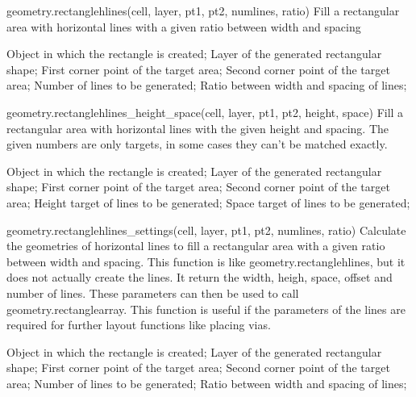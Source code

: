 \begin{APIfunc}{geometry.rectanglehlines(cell, layer, pt1, pt2, numlines, ratio)}
    Fill a rectangular area with horizontal lines with a given ratio between width and spacing
    \begin{APIparameters}
            Object in which the rectangle is created;
            Layer of the generated rectangular shape;
            First corner point of the target area;
            Second corner point of the target area;
            Number of lines to be generated;
            Ratio between width and spacing of lines;
    \end{APIparameters}
\end{APIfunc}
\begin{APIfunc}{geometry.rectanglehlines\_height\_space(cell, layer, pt1, pt2, height, space)}
    Fill a rectangular area with horizontal lines with the given height and spacing. The given numbers are only targets, in some cases they can't be matched exactly.
    \begin{APIparameters}
            Object in which the rectangle is created;
            Layer of the generated rectangular shape;
            First corner point of the target area;
            Second corner point of the target area;
            Height target of lines to be generated;
            Space target of lines to be generated;
    \end{APIparameters}
\end{APIfunc}
\begin{APIfunc}{geometry.rectanglehlines\_settings(cell, layer, pt1, pt2, numlines, ratio)}
    Calculate the geometries of horizontal lines to fill a rectangular area with a given ratio between width and spacing. This function is like geometry.rectanglehlines, but it does not actually create the lines. It return the width, heigh, space, offset and number of lines. These parameters can then be used to call geometry.rectanglearray. This function is useful if the parameters of the lines are required for further layout functions like placing vias.
    \begin{APIparameters}
            Object in which the rectangle is created;
            Layer of the generated rectangular shape;
            First corner point of the target area;
            Second corner point of the target area;
            Number of lines to be generated;
            Ratio between width and spacing of lines;
    \end{APIparameters}
\end{APIfunc}
